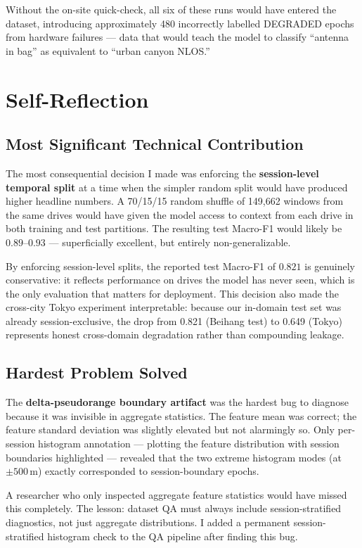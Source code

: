 \documentclass[12pt,a4paper]{article}
\begin{document}
Without the on-site quick-check, all six of these runs would have entered the dataset,
introducing approximately 480 incorrectly labelled DEGRADED epochs from hardware failures
--- data that would teach the model to classify ``antenna in bag'' as equivalent to
``urban canyon NLOS.''


\section{Self-Reflection}

\subsection{Most Significant Technical Contribution}

The most consequential decision I made was enforcing the \textbf{session-level temporal
split} at a time when the simpler random split would have produced higher headline numbers.
A 70/15/15 random shuffle of 149,662 windows from the same drives would have given
the model access to context from each drive in both training and test partitions.
The resulting test Macro-F1 would likely be $0.89$--$0.93$ --- superficially excellent,
but entirely non-generalizable.

By enforcing session-level splits, the reported test Macro-F1 of $0.821$ is genuinely
conservative: it reflects performance on drives the model has never seen, which is the
only evaluation that matters for deployment.
This decision also made the cross-city Tokyo experiment interpretable: because our
in-domain test set was already session-exclusive, the drop from 0.821 (Beihang test) to
0.649 (Tokyo) represents honest cross-domain degradation rather than compounding leakage.

\subsection{Hardest Problem Solved}

The \textbf{delta-pseudorange boundary artifact} was the hardest bug to diagnose because
it was invisible in aggregate statistics.
The feature mean was correct; the feature standard deviation was slightly elevated but not
alarmingly so.
Only per-session histogram annotation --- plotting the feature distribution with session
boundaries highlighted --- revealed that the two extreme histogram modes (at $\pm 500$\,m)
exactly corresponded to session-boundary epochs.

A researcher who only inspected aggregate feature statistics would have missed this
completely.
The lesson: dataset QA must always include session-stratified diagnostics, not just
aggregate distributions.
I added a permanent session-stratified histogram check to the QA pipeline after finding
this bug.




\end{document}
